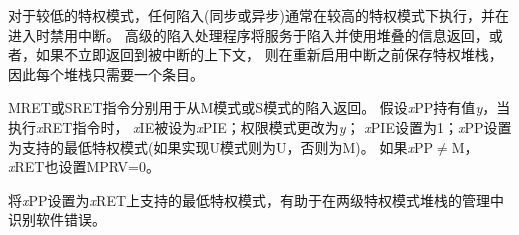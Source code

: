 \iffalse
\begin{commentary}
For lower privilege modes, any trap (synchronous or asynchronous) is
usually taken at a higher privilege mode with interrupts disabled upon entry.
The higher-level trap handler will either service the trap and return
using the stacked information, or, if not returning immediately to the
interrupted context, will save the privilege stack before re-enabling
interrupts, so only one entry per stack is required.
\end{commentary}
\fi

\begin{commentary}
对于较低的特权模式，任何陷入(同步或异步)通常在较高的特权模式下执行，并在进入时禁用中断。
高级的陷入处理程序将服务于陷入并使用堆叠的信息返回，或者，如果不立即返回到被中断的上下文，
则在重新启用中断之前保存特权堆栈，因此每个堆栈只需要一个条目。
\end{commentary}

\iffalse
An MRET or SRET instruction is used to return from
a trap in M-mode or S-mode respectively.  When
executing an {\em x}\/RET instruction, supposing {\em x}\/PP holds the
value {\em y}, {\em x}\/IE is set to {\em x}\/PIE; the privilege mode
is changed to {\em y}; {\em x}\/PIE is set to 1; and {\em x}\/PP is
set to the least-privileged supported mode (U if U-mode is implemented, else M).
If {\em x}\/PP$\neq$M, {\em x}\/RET also sets MPRV=0.
\fi

MRET或SRET指令分别用于从M模式或S模式的陷入返回。
假设{\em x}\/PP持有值{\em y}，当执行{\em x}\/RET指令时， 
{\em x}\/IE被设为{\em x}\/PIE；权限模式更改为{\em y}；
{\em x}\/PIE设置为1；{\em x}\/PP设置为支持的最低特权模式(如果实现U模式则为U，否则为M)。
如果{\em x}\/PP$\neq$M， {\em x}\/RET也设置MPRV=0。

\iffalse
\begin{commentary}
Setting {\em x}\/PP to the least-privileged supported mode on an {\em x}\/RET
helps identify software bugs in the management of the two-level privilege-mode
stack.
\end{commentary}
\fi

\begin{commentary}
将{\em x}\/PP设置为{\em x}\/RET上支持的最低特权模式，有助于在两级特权模式堆栈的管理中识别软件错误。
\end{commentary}

\iffalse
{\em x}\/PP fields are \warl\ fields that can hold only privilege mode {\em x}
and any implemented privilege mode lower than {\em x}.  If privilege mode {\em
x} is not implemented, then {\em x}\/PP must be read-only~0.
\fi

